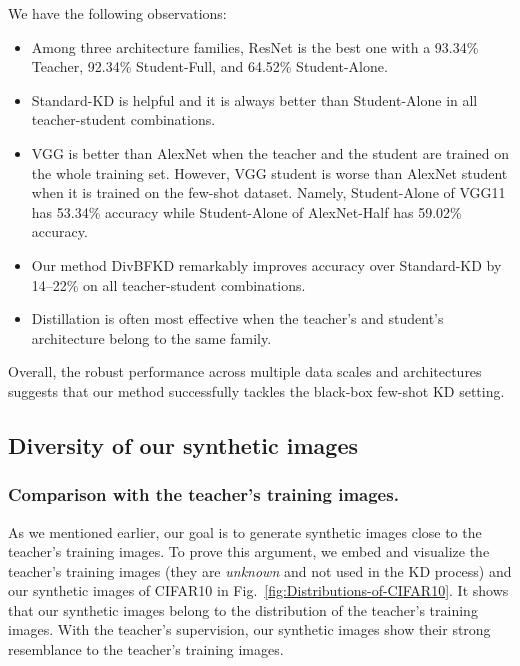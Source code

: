 \begin{foldable}
  We have the following observations:
  \begin{itemize}
    \item Among three architecture families, ResNet is the best one with a 93.34\% Teacher, 92.34\% Student-Full, and 64.52\% Student-Alone.
    \item Standard-KD is helpful and it is always better than Student-Alone in all teacher-student combinations.
    \item {
        VGG is better than AlexNet when the teacher and the student are trained on the whole training set.
        However, VGG student is worse than AlexNet student when it is trained on the few-shot dataset.
        Namely, Student-Alone of VGG11 has 53.34\% accuracy while Student-Alone of AlexNet-Half has 59.02\% accuracy.
      }
    \item Our method DivBFKD remarkably improves accuracy over Standard-KD by 14--22\% on all teacher-student combinations.
    \item Distillation is often most effective when the teacher's and student's architecture belong to the same family.
  \end{itemize}
  Overall, the robust performance across multiple data scales and architectures suggests that our method successfully tackles the black-box few-shot \ac{KD} setting.
\end{foldable}

\subsection{Diversity of our synthetic images}

\subsubsection{Comparison with the teacher's training images.}

\begin{foldable}
  As we mentioned earlier, our goal is to generate synthetic images close to the teacher's training images.
  To prove this argument, we embed and visualize the teacher's training images (they are \textit{unknown} and not used in the \ac{KD} process) and our synthetic images of CIFAR10 in Fig.~\ref{fig:Distributions-of-CIFAR10}.
  It shows that our synthetic images belong to the distribution of the teacher's training images.
  With the teacher's supervision, our synthetic images show their strong resemblance to the teacher's training images.
\end{foldable}

